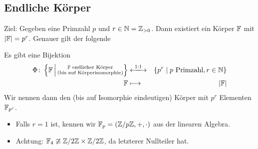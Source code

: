 \documentclass[12pt,a4paper]{scrartcl}
\begin{document}
\subsection{Endliche Körper}
Ziel: Gegeben eine Primzahl $p$ und $r\in\mathbb N= \mathbb Z_{>0}$. Dann existiert ein Körper $\mathbb F$ mit $|\mathbb F| = p^r$. Genauer gilt der folgende
\begin{satz}\label{thm:17.1}
	Es gibt eine Bijektion
	\begin{eqnarray*}
		\Phi\colon\left\{\IF\,\middle|\,\substack{\text{$\IF$ endlicher Körper}\\\text{(bis auf Körperisomorphie)}}\right\}& \xlongleftrightarrow{1:1}& \{p^r\mid \text{$p$ Primzahl}, r\in\IN\}\\
		\IF & \longmapsto & |\IF|
	\end{eqnarray*}
	Wir nennen dann den (bis auf Isomorphie eindeutigen) Körper mit $p^r$ Elementen $\mathbb F_{p^r}$.
\end{satz}
\begin{bem}
	\leavevmode
	\begin{itemize}
		\item Falls $r = 1$ ist, kennen wir $\mathbb F_p = (\mathbb Z/p\mathbb Z, +, \cdot)$ aus der linearen Algebra.
		\item Achtung: $\mathbb F_4 \ncong \mathbb Z/2\mathbb Z\times \mathbb Z/2\mathbb Z$, da letzterer Nullteiler hat.
	\end{itemize}
\end{bem}
\end{document}
